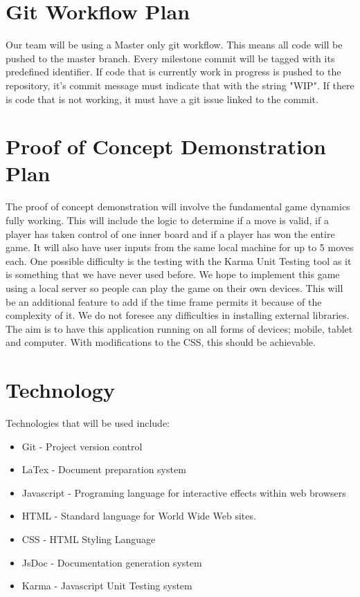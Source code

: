 \documentclass{article}
\begin{document}
\section{Git Workflow Plan}
Our team will be using a Master only git workflow.
This means all code will be pushed to the master branch. Every milestone commit
will be tagged with its predefined identifier. If code that is currently work in
progress is pushed to the repository, it's commit message must indicate that with the
string "WIP". If there is code that is not working, it must have a git issue
linked to the commit.

\section{Proof of Concept Demonstration Plan}
The proof of concept demonstration will involve the fundamental game dynamics
fully working. This will include the logic to determine if a move is valid, if a
player has taken control of one inner board and if a player has won the entire
game. It will also have user inputs from the same local machine for up to 5
moves each. One possible difficulty is the testing with the Karma Unit Testing
tool as it is something that we have never used before. We hope to implement
this game using a local server so people can play the game on their own devices.
This will be an additional feature to add if the time frame permits it because
of the complexity of it. We do not foresee any difficulties in installing
external libraries. The aim is to have this application running on all forms of
devices; mobile, tablet and computer. With modifications to the CSS, this should
be achievable.

\section{Technology}
Technologies that will be used include:

\begin{itemize}

  \item Git - Project version control
  \item LaTex - Document preparation system
  \item Javascript - Programing language for interactive effects within web browsers
  \item HTML - Standard language for World Wide Web sites.
  \item CSS - HTML Styling Language 
  \item JsDoc - Documentation generation system
  \item Karma - Javascript Unit Testing system 

\end{itemize}
\end{document}
